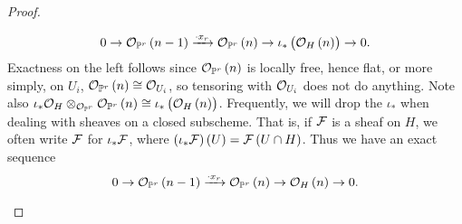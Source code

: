 \begin{proof}
\begin{itemize}
$$ 0 \to \OOO_{\PP^r}\br{n - 1} \xrightarrow{\cdot x_r} \OOO_{\PP^r}\br{n} \to \iota_*\br{\OOO_H\br{n}} \to 0. $$
Exactness on the left follows since $ \OOO_{\PP^r}\br{n} $ is locally free, hence flat, or more simply, on $ U_i $, $ \OOO_{\PP^r}\br{n} \cong \OOO_{U_i} $, so tensoring with $ \mathcal{O}_{U_i} $ does not do anything. Note also $ \iota_*\OOO_H \otimes_{\OOO_{\PP^r}} \OOO_{\PP^r}\br{n} \cong \iota_*\br{\OOO_H\br{n}} $. Frequently, we will drop the $ \iota_* $ when dealing with sheaves on a closed subscheme. That is, if $ \mathcal{F} $ is a sheaf on $ H $, we often write $ \mathcal{F} $ for $ \iota_*\mathcal{F} $, where $ \br{\iota_*\FFF}\br{U} = \FFF\br{U \cap H} $. Thus we have an exact sequence
$$ 0 \to \OOO_{\PP^r}\br{n - 1} \xrightarrow{\cdot x_r} \OOO_{\PP^r}\br{n} \to \OOO_H\br{n} \to 0. $$

\pagebreak


\end{itemize}
\end{proof}
